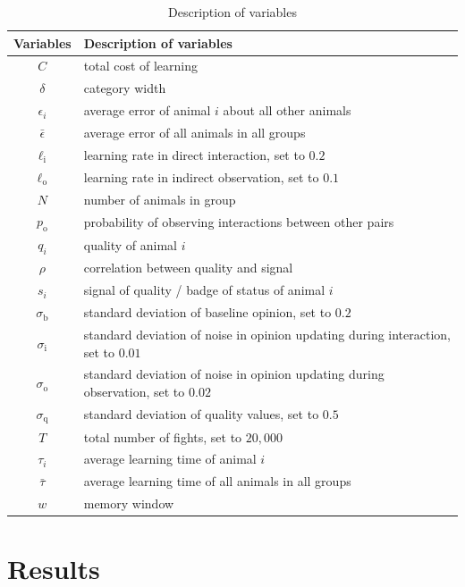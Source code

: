 %
\begin {table}[ht]
\caption {Description of variables} \label{tab:vars} 
\begin{tabular}{cl}
\toprule
 Variables & Description of variables \\
\midrule 
$C$ & total cost of learning \\ 
$\delta$ & category width \\
$\epsilon_i$ & average error of animal $i$ about all other animals \\
$\bar{\epsilon}$ & average error of all animals in all groups \\
$\ell_\text{i}$ & learning rate in direct interaction, set to $0.2$ \\
$\ell_\text{o}$ & learning rate in indirect observation, set to $0.1$ \\
$N$ & number of animals in group \\ 
$p_\text{o}$ & probability of observing interactions between other pairs \\
 $q_i$ & quality of animal $i$ \\ 
 $\rho$ & correlation between quality and signal \\
$s_i$ & signal of quality / badge of status of animal $i$ \\ 
$\sigma_\text{b}$ & standard deviation of baseline opinion, set to $0.2$ \\
$\sigma_\text{i}$ & standard deviation of noise in opinion updating during interaction, set to $0.01$ \\
$\sigma_\text{o}$ & standard deviation of noise in opinion updating during observation, set to $0.02$ \\
$\sigma_\text{q}$ & standard deviation of quality values, set to $0.5$ \\
$T$ & total number of fights, set to $20,000$ \\
$\tau_i$ & average learning time of animal $i$ \\
$\bar{\tau}$ & average learning time of all animals in all groups \\ 
$w$ & memory window \\
\bottomrule
\end{tabular}
\end {table}



\section*{Results}
%
